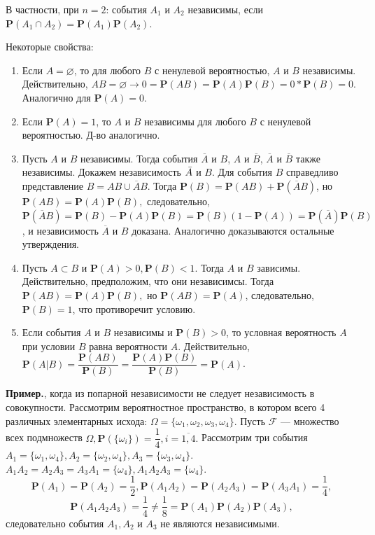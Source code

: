 \documentclass[oneside,final,14pt]{extreport}
\newcommand\myex{{\bf Пример.}}
\newcommand\myprob[1]{{\mathbf{P}(#1)}}
\theoremstyle{definition}
\begin{document}
В частности, при $n = 2$: события $A_1$ и $A_2$ независимы, если $\myprob{A_1 \cap A_2} = \myprob{A_1}\myprob{A_2}$.

Некоторые свойства:

\begin{enumerate} 
    \item Если $A = \varnothing$, то для любого $B$ с ненулевой вероятностью, $A$ и $B$ независимы. Действительно, $AB = \varnothing \rightarrow 0 = \myprob{AB} = \myprob{A}\myprob{B} = 0 * \myprob{B} = 0$. Аналогично для $\myprob{A} = 0$.
    \item Если $\myprob{A} = 1$, то $A$ и $B$ независимы для любого $B$ с ненулевой вероятностью. Д-во аналогично.
    \item Пусть $A$ и $B$ независимы. Тогда события $\overline{A}$ и $B$, $A$ и $\overline{B}$, $\overline{A}$ и $\overline{B}$ также независимы. Докажем независимость $\Bar{A}$ и $B$. Для события $B$ справедливо представление $B = AB \cup \overline{A}B.$ Тогда $\myprob{B} = \myprob{AB} + \myprob{\overline{A}B}$, но $\myprob{AB} = \myprob{A}\myprob{B},$ следовательно, $\myprob{\overline{A}B} = \myprob{B} - \myprob{A}\myprob{B} = \myprob{B} (1 - \myprob{A}) = \myprob{\overline{A}}\myprob{B}$, и независимость $\overline{A}$ и $B$ доказана. Аналогично доказываются остальные утверждения.
    \item Пусть $A \subset B$ и $\myprob{A} > 0, \myprob{B} < 1$. Тогда $A$ и $B$ зависимы. Действительно, предположим, что они независимсы. Тогда $\myprob{AB} = \myprob{A}\myprob{B},$ но $\myprob{AB} = \myprob{A}$, следовательно, $\myprob{B} = 1$, что противоречит условию.
    \item Если события $A$ и $B$ независимы и $\myprob{B} > 0$, то условная вероятность $A$ при условии $B$ равна вероятности $A$. Действительно, $\myprob{A | B} = \dfrac{\myprob{AB}}{\myprob{B}} = \dfrac{\myprob{A}\myprob{B}}{\myprob{B}} = \myprob{A}$.
\end{enumerate}
\myex{}, когда из попарной независимости не следует независимость в совокупности.
Рассмотрим вероятностное пространство, в котором всего 4 различных элементарных исхода: $\Omega = \{ \omega_1, \omega_2, \omega_3, \omega_4 \}$. Пусть $\mathcal{F}$ --- множество всех подмножеств $\Omega, \myprob{\{\omega_i\}} = \dfrac{1}{4}, i = \overline{1,4}.$ Рассмотрим три события $A_1 = \{ \omega_1, \omega_4 \}, A_2 = \{ \omega_2, \omega_4 \}, A_3 = \{ \omega_3, \omega_4 \}$. $A_1A_2 = A_2A_3 = A_3A_1 = \{ \omega_4 \}, A_1A_2A_3 = \{ \omega_4 \}$.
$$ \myprob{A_1} = \myprob{A_2} = \dfrac{1}{2}, \myprob{A_1A_2} = \myprob{A_2A_3} = \myprob{A_3A_1} = \dfrac{1}{4}, $$$$ \myprob{A_1A_2A_3} = \dfrac{1}{4} \neq \dfrac{1}{8} = \myprob{A_1}\myprob{A_2}\myprob{A_3},$$ следовательно события $A_1, A_2$ и $A_3$ не являются независимыми. 
\end{document}

